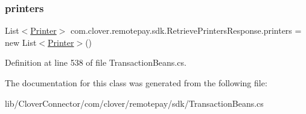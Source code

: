 \subsubsection{\texorpdfstring{printers}{printers}}
{\footnotesize\ttfamily List$<$\hyperlink{classcom_1_1clover_1_1sdk_1_1v3_1_1printer_1_1_printer}{Printer}$>$ com.\+clover.\+remotepay.\+sdk.\+Retrieve\+Printers\+Response.\+printers = new List$<$\hyperlink{classcom_1_1clover_1_1sdk_1_1v3_1_1printer_1_1_printer}{Printer}$>$()}



Definition at line 538 of file Transaction\+Beans.\+cs.



The documentation for this class was generated from the following file\+:\begin{DoxyCompactItemize}
\item 
lib/\+Clover\+Connector/com/clover/remotepay/sdk/Transaction\+Beans.\+cs\end{DoxyCompactItemize}
